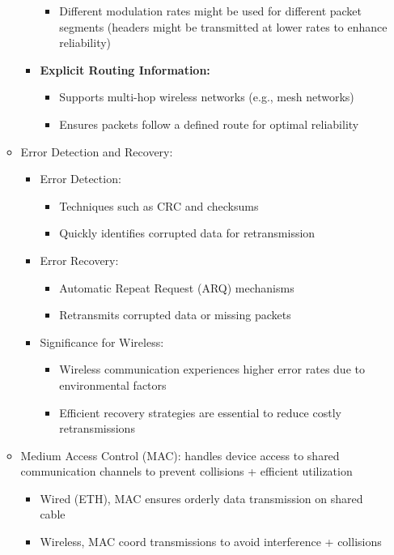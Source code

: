 \documentclass[10pt,landscape]{article}
\newcommand{\1}{\mathmybb{1}}
\begin{document}
\begin{multicols*}{3}
\begin{enumerate}
\begin{itemize}
\begin{itemize}
\begin{itemize}
            \item  Different modulation rates might be used for different packet segments (headers might be transmitted at lower rates to
            enhance reliability) 
          \end{itemize}
        \item \textbf{Explicit Routing Information:}
          \begin{itemize}
            \item Supports multi-hop wireless networks (e.g., mesh networks)
            \item Ensures packets follow a defined route for optimal reliability
          \end{itemize}
      \end{itemize}
    \item Error Detection and Recovery:
    \begin{itemize}
      \item Error Detection:
      \begin{itemize}
        \item Techniques such as CRC and checksums
        \item  Quickly identifies corrupted data for retransmission
      \end{itemize}
      \item Error Recovery:
      \begin{itemize}
        \item Automatic Repeat Request (ARQ) mechanisms
        \item  Retransmits corrupted data or missing packets
      \end{itemize}
      \item Significance for Wireless:
      \begin{itemize}
        \item Wireless communication experiences higher error rates due to environmental factors
        \item  Efficient recovery strategies are essential to reduce costly retransmissions
      \end{itemize}
    \end{itemize}
    \item Medium Access Control (MAC): handles device access to shared communication channels to prevent collisions + efficient utilization
    \begin{itemize}
      \item Wired (ETH), MAC ensures orderly data transmission on shared cable
      \item Wireless, MAC coord transmissions to avoid interference + collisions
    \end{itemize}
  \end{itemize}
\end{enumerate}


\end{multicols*}
\end{document}
